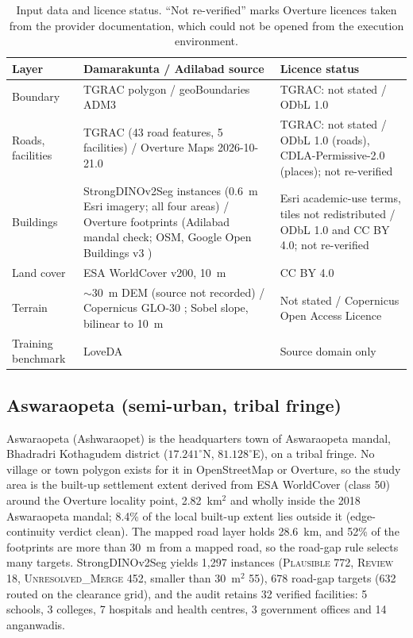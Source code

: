 \documentclass[12pt,a4paper]{article}
\newcommand{\dinoseg}{StrongDINOv2Seg}
\begin{document}
\begin{table}[t]
\caption{Input data and licence status. ``Not re-verified'' marks Overture licences taken from the provider documentation, which could not be opened from the execution environment.}
\label{tab:data}
\centering
\footnotesize
\begin{tabular}{@{}>{\raggedright\arraybackslash}p{3.0cm}>{\raggedright\arraybackslash}p{5.9cm}>{\raggedright\arraybackslash}p{5.5cm}@{}}
\toprule
Layer & Damarakunta / Adilabad source & Licence status \\
\midrule
Boundary & TGRAC polygon / geoBoundaries ADM3 \cite{runfola2020geoboundaries} & TGRAC: not stated / ODbL 1.0 \\
Roads, facilities & TGRAC (43 road features, 5 facilities) / Overture Maps 2026-10-21.0 \cite{overture2026} & TGRAC: not stated / ODbL 1.0 (roads), CDLA-Permissive-2.0 (places); not re-verified \\
Buildings & StrongDINOv2Seg instances (0.6~m Esri imagery; all four areas) / Overture footprints (Adilabad mandal check; OSM, Google Open Buildings v3 \cite{sirko2021openbuildings}) & Esri academic-use terms, tiles not redistributed / ODbL 1.0 and CC BY 4.0; not re-verified \\
Land cover & ESA WorldCover v200, 10~m \cite{zanaga2021worldcover} & CC BY 4.0 \\
Terrain & $\sim$30~m DEM (source not recorded) / Copernicus GLO-30 \cite{esa2022copdem}; Sobel slope, bilinear to 10~m & Not stated / Copernicus Open Access Licence \\
Training benchmark & LoveDA \cite{wang2021loveda} & Source domain only \\
\bottomrule
\end{tabular}
\end{table}

\subsection{Aswaraopeta (semi-urban, tribal fringe)}
Aswaraopeta (Ashwaraopet) is the headquarters town of Aswaraopeta mandal, Bhadradri Kothagudem district ($17.241^{\circ}$N, $81.128^{\circ}$E), on a tribal fringe. No village or town polygon exists for it in OpenStreetMap or Overture, so the study area is the built-up settlement extent derived from ESA WorldCover (class 50) around the Overture locality point, 2.82~km$^2$ and wholly inside the 2018 Aswaraopeta mandal; 8.4\% of the local built-up extent lies outside it (edge-continuity verdict clean). The mapped road layer holds 28.6~km, and 52\% of the footprints are more than 30~m from a mapped road, so the road-gap rule selects many targets. \dinoseg{} yields 1{,}297 instances (\textsc{Plausible} 772, \textsc{Review} 18, \textsc{Unresolved\_Merge} 452, smaller than 30~m$^2$ 55), 678 road-gap targets (632 routed on the clearance grid), and the audit retains 32 verified facilities: 5 schools, 3 colleges, 7 hospitals and health centres, 3 government offices and 14 anganwadis.
\end{document}
